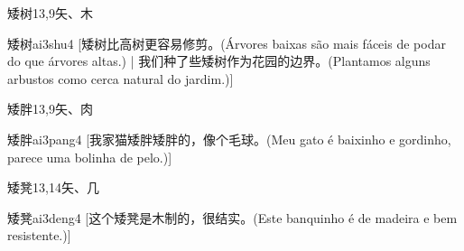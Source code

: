 \begin{entry}{矮树}{13,9}{⽮、⽊}
  \begin{phonetics}{矮树}{ai3shu4}
    [矮树比高树更容易修剪。(Árvores baixas são mais fáceis de podar do que árvores altas.) | 我们种了些矮树作为花园的边界。(Plantamos alguns arbustos como cerca natural do jardim.)]
  \end{phonetics}
\end{entry}

\begin{entry}{矮胖}{13,9}{⽮、⾁}
  \begin{phonetics}{矮胖}{ai3pang4}
    [我家猫矮胖矮胖的，像个毛球。(Meu gato é baixinho e gordinho, parece uma bolinha de pelo.)]
  \end{phonetics}
\end{entry}

\begin{entry}{矮凳}{13,14}{⽮、⼏}
  \begin{phonetics}{矮凳}{ai3deng4}
    [这个矮凳是木制的，很结实。(Este banquinho é de madeira e bem resistente.)]
  \end{phonetics}
\end{entry}


